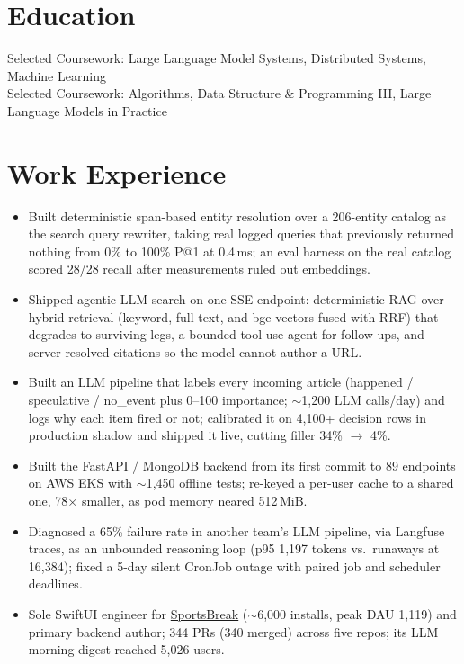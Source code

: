 \documentclass[11pt, letterpaper]{article}
\begin{document}

\section{Education}
Selected Coursework: Large Language Model Systems, Distributed Systems, Machine Learning\\[1pt]
Selected Coursework: Algorithms, Data Structure \& Programming III, Large Language Models in Practice

\section{Work Experience}
\begin{itemize}
  \item Built deterministic span-based entity resolution over a 206-entity catalog as the search query rewriter, taking real logged queries that previously returned nothing from 0\% to 100\% P@1 at 0.4\,ms; an eval harness on the real catalog scored 28/28 recall after measurements ruled out embeddings.
  \item Shipped agentic LLM search on one SSE endpoint: deterministic RAG over hybrid retrieval (keyword, full-text, and bge vectors fused with RRF) that degrades to surviving legs, a bounded tool-use agent for follow-ups, and server-resolved citations so the model cannot author a URL.
  \item Built an LLM pipeline that labels every incoming article (happened / speculative / no\_event plus 0--100 importance; $\sim$1{,}200 LLM calls/day) and logs why each item fired or not; calibrated it on 4{,}100+ decision rows in production shadow and shipped it live, cutting filler 34\% $\to$ 4\%.
  \item Built the FastAPI / MongoDB backend from its first commit to 89 endpoints on AWS EKS with $\sim$1{,}450 offline tests; re-keyed a per-user cache to a shared one, 78$\times$ smaller, as pod memory neared 512\,MiB.
  \item Diagnosed a 65\% failure rate in another team's LLM pipeline, via Langfuse traces, as an unbounded reasoning loop (p95 1{,}197 tokens vs.\ runaways at 16{,}384); fixed a 5-day silent CronJob outage with paired job and scheduler deadlines.
  \item Sole SwiftUI engineer for \href{https://apps.apple.com/app/id6762649287}{SportsBreak} ($\sim$6{,}000 installs, peak DAU 1{,}119) and primary backend author; 344 PRs (340 merged) across five repos; its LLM morning digest reached 5{,}026 users.
\end{itemize}
\end{document}
